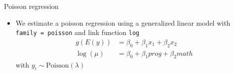 \documentclass{beamer}
\begin{document}
\begin{frame}{Poisson regression}
  \begin{itemize}
    \item We estimate a poisson regression using a generalized linear model
      with \texttt{family = poisson} and link function \texttt{log}
  \begin{align*}
    g(E(y)) & = \beta_0 + \beta_1 x_1 + \beta_2 x_2\\
    \log(\mu) & = \beta_0 + \beta_1 prog + \beta_2 math
  \end{align*}
  with $y_i \sim \text{Poisson}(\lambda)$
  \end{itemize}
\end{frame}
\end{document}
